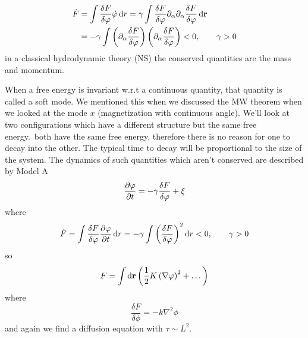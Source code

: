 \begin{description}
	\begin{align}
		\dot F &= \int\frac{\delta F}{\delta \varphi}\dot{\varphi}\mathop{}\!\mathrm{d} r = \gamma\int\frac{\delta F}{\delta \varphi}\partial_\alpha\partial_\alpha\frac{\delta F}{\delta\varphi}\mathop{}\!\mathrm{d} \mathbf{r}\\
		&= -\gamma\int\left(\partial_\alpha\frac{\delta F}{\delta\varphi}\right)\left(\partial_\alpha\frac{\delta F}{\delta\varphi}\right)<0, \qquad \gamma > 0
	\end{align}
	in a classical hydrodynamic theory (NS) the conserved quantities are the mass and momentum.
	\item[Soft/Goldstone Mode] When a free energy is invariant w.r.t a continuous quantity, that quantity is called a soft mode. We mentioned this when we discussed the MW theorem when we looked at the mode \(x\) (magnetization with continuous angle). We'll look at two configurations which have a different structure but the same free energy.\ both have the same free energy, therefore there is no reason for one to decay into the other. The typical time to decay will be proportional to the size of the system. The dynamics of such quantities which aren't conserved are described by Model A
	\begin{equation}
		\diffp{\phi}{t} = -\gamma\frac{\delta F}{\delta \phi}+\xi
	\end{equation}
	where
	\begin{equation}
		\dot F = \int\frac{\delta F}{\delta \phi}\diffp{\phi}{t}\dd r = -\gamma\int\ins{\frac{\delta F}{\delta \phi}}^2\dd r < 0, \qquad \gamma > 0
	\end{equation}
	so
	\begin{equation}
		F = \int\mathop{}\!\mathrm{d} \mathbf{r}\left(\frac{1}{2}K\left(\nabla\varphi\right)^2+\dots\right)
	\end{equation}
	where
	\begin{equation}
		\frac{\delta F}{\delta\phi} = -k\nabla^2\phi
	\end{equation}
	and again we find a diffusion equation with \(\tau\sim L^2\).
\end{description}
